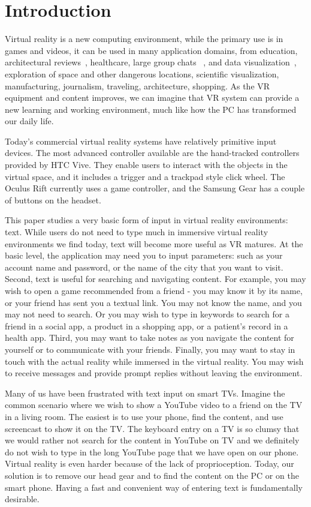 \section{Introduction}

Virtual reality is a new computing environment, while the primary use is in games and videos, it can be used in many application domains, from education, architectural reviews~\cite{guerreiro2014beyond}, healthcare, large group chats ~\cite{mcnerney1999system}, and data visualization~\cite{abbott2011empire}, exploration of space and other dangerous locations, scientific visualization, manufacturing, journalism, traveling, architecture, shopping.
As the VR equipment and content improves, we can imagine that VR system can provide a new learning and working environment, much like how the PC has transformed our daily life.

Today's commercial virtual reality systems have relatively primitive input devices.
The most advanced controller available are the hand-tracked controllers provided by HTC Vive.
They enable users to interact with the objects in the virtual space, and it includes a trigger and a trackpad style click wheel.
The Oculus Rift currently uses a game controller, and the Samsung Gear has a couple of buttons on the headset.

This paper studies a very basic form of input in virtual reality environments: text.
While users do not need to type much in immersive virtual reality environments we find today, text will become more useful as VR matures.
At the basic level, the application may need you to input parameters: such as your account name and password, or the name of the city that you want to visit.
Second, text is useful for searching and navigating content.
For example, you may wish to open a game recommended from a friend - you may know it by its name, or your friend has sent you a textual link.
You may not know the name, and you may not need to search.
Or you may wish to type in keywords to search for a friend in a social app, a product in a shopping app, or a patient’s record in a health app.
Third, you may want to take notes as you navigate the content for yourself or to communicate with your friends.
Finally, you may want to stay in touch with the actual reality while immersed in the virtual reality.
You may wish to receive messages and provide prompt replies without leaving the environment.

Many of us have been frustrated with text input on smart TVs. Imagine the common scenario where we wish to show a YouTube video to a friend on the TV in a living room.
The easiest is to use your phone, find the content, and use screencast to show it on the TV.
The keyboard entry on a TV is so clumsy that we would rather not search for the content in YouTube on TV and we definitely do not wish to type in the long YouTube page that we have open on our phone.
Virtual reality is even harder because of the lack of proprioception.
Today, our solution is to remove our head gear and to find the content on the PC or on the smart phone.
Having a fast and convenient way of entering text is fundamentally desirable.

